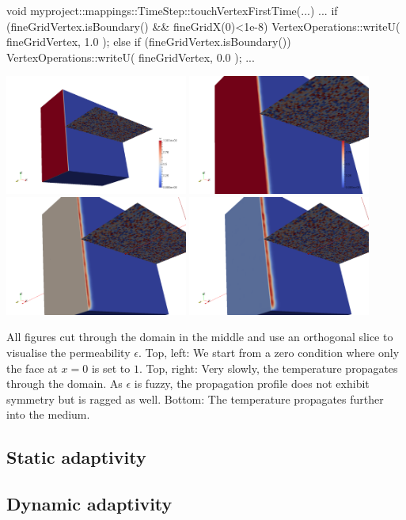 \begin{code}
void myproject::mappings::TimeStep::touchVertexFirstTime(...) {
  ...
  if (fineGridVertex.isBoundary() && fineGridX(0)<1e-8) {
    VertexOperations::writeU( fineGridVertex, 1.0 );
  }
  else if (fineGridVertex.isBoundary()) {
    VertexOperations::writeU( fineGridVertex, 0.0 );
  }
  ...
}
\end{code}

\begin{center}
  \includegraphics[width=0.45\textwidth]{41_heat-equation/solution00.png}
  \includegraphics[width=0.45\textwidth]{41_heat-equation/solution01.png}
  \includegraphics[width=0.45\textwidth]{41_heat-equation/solution02.png}
  \includegraphics[width=0.45\textwidth]{41_heat-equation/solution03.png}
\end{center}


All figures cut through the domain in the middle and use an orthogonal slice to
visualise the permeability $\epsilon$.
Top, left: We start from a zero condition where only the face at $x=0$ is set to
$1$.
Top, right: Very slowly, the temperature propagates through the domain. As
$\epsilon $ is fuzzy, the propagation profile does not exhibit symmetry but is
ragged as well.
Bottom: The temperature propagates further into the medium.


\subsection{Static adaptivity}





\subsection{Dynamic adaptivity}
